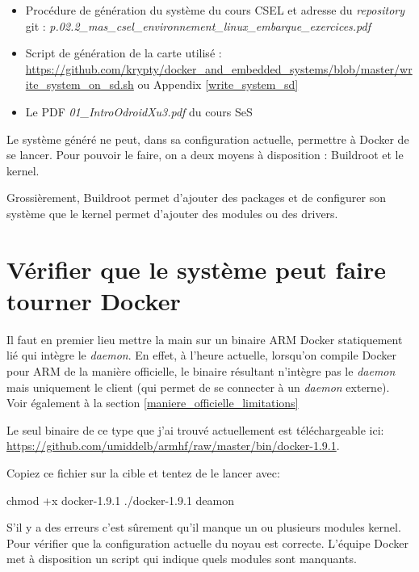\documentclass[11pt,a4paper,oneside]{report}
\begin{document}
\begin{itemize}
  \item Procédure de génération du système du cours CSEL et adresse du \textit{repository} git : \emph{\newline p.02.2\_mas\_csel\_environnement\_linux\_embarque\_exercices.pdf}
  \item Script de génération de la carte utilisé : \url{https://github.com/krypty/docker\_and\_embedded\_systems/blob/master/write\_system\_on\_sd.sh} ou Appendix \ref{write_system_sd}
  \item Le PDF \emph{01\_IntroOdroidXu3.pdf} du cours SeS
\end{itemize}

Le système généré ne peut, dans sa configuration actuelle, permettre à Docker de se lancer. Pour pouvoir le faire, on a deux moyens à disposition : Buildroot et le kernel.

Grossièrement, Buildroot permet d'ajouter des packages et de configurer son système      que le kernel permet d'ajouter des modules ou des drivers.

\section{Vérifier que le système peut faire tourner Docker}

Il faut en premier lieu mettre la main sur un binaire ARM Docker statiquement lié qui intègre le \emph{daemon}. En effet, à l'heure actuelle, lorsqu'on compile Docker pour ARM de la manière officielle, le binaire résultant n'intègre pas le \emph{daemon} mais uniquement le client (qui permet de se connecter à un \emph{daemon} externe). Voir également à la section \ref{maniere_officielle_limitations}

Le seul binaire de ce type que j'ai trouvé actuellement est téléchargeable ici: \url{https://github.com/umiddelb/armhf/raw/master/bin/docker-1.9.1}\label{binaire_arm}.

Copiez ce fichier sur la cible et tentez de le lancer avec:

\begin{bashcode}
chmod +x docker-1.9.1
./docker-1.9.1 deamon
\end{bashcode}

S'il y a des erreurs c'est sûrement qu'il manque un ou plusieurs modules kernel. Pour vérifier que la configuration actuelle du noyau est correcte. L'équipe Docker met à disposition un script qui indique quels modules sont manquants.
\end{document}
